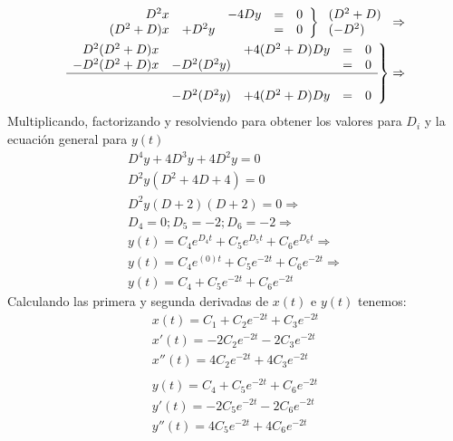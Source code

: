 \documentclass[12pt,spanish,lettersize]{article}
\begin{document}
\begin{eqnarray}
\left.
\begin{array}{rcccr}
D^2x     &       & -4Dy & = & 0 \\
(D^2+D)x & +D^2y &      & = & 0 \\
\end{array}
\right\rbrace
\left.
\begin{array}{l}
(D^2+D) \\
(-D^2) \\
\end{array}
\right. \Rightarrow \\
\left.
\begin{array}{rcccr}
D^2(D^2+D)x  &            & +4(D^2+D)Dy & = & 0 \\
-D^2(D^2+D)x & -D^2(D^2y) &             & = & 0 \\
\hline \\
             & -D^2(D^2y) & +4(D^2+D)Dy & = & 0
\end{array}
\right\rbrace \Rightarrow\\
\end{eqnarray}
Multiplicando, factorizando y resolviendo para obtener los valores para $D_i$ y la ecuaci\'on general para $y(t)$
\begin{eqnarray}
\nonumber D^4y+4D^3y+4D^2y = 0\\
\nonumber D^2y(D^2+4D+4)=0\\
\nonumber D^2y(D+2)(D+2)=0\Rightarrow\\
\nonumber D_{4}=0;D_{5}=-2;D_{6}=-2\Rightarrow \\
\nonumber y(t)=C_{4}e^{D_{4}t}+C_{5}e^{D_{5}t}+C_{6}e^{D_{6}t}\Rightarrow \\
\nonumber y(t)=C_{4}e^{(0)t}+C_{5}e^{-2t}+C_{6}e^{-2t} \Rightarrow \\
y(t)=C_{4}+C_{5}e^{-2t}+C_{6}e^{-2t}
\end{eqnarray}
Calculando las primera y segunda derivadas de $x(t)$ e $y(t)$ tenemos:
\begin{eqnarray}
\nonumber x(t)=C_1+C_2e^{-2t}+C_3e^{-2t}\\
x'(t)  = -2C_2e^{-2t}-2C_3e^{-2t}\\
x''(t) =  4C_2e^{-2t}+4C_3e^{-2t}\\
\nonumber \\
\nonumber y(t)=C_4+C_5e^{-2t}+C_6e^{-2t} \\
y'(t)  = -2C_5e^{-2t}-2C_6e^{-2t}\\
y''(t) =  4C_5e^{-2t}+4C_6e^{-2t}
\end{eqnarray}
\end{document}
